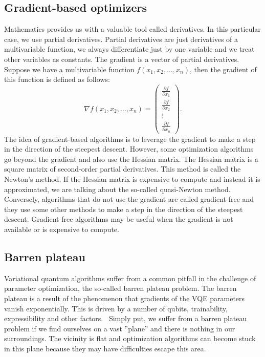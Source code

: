 \subsection{Gradient-based optimizers}
Mathematics provides us with a valuable tool called derivatives. In this particular case, we use partial derivatives. Partial derivatives are just derivatives of a multivariable function, we always differentiate just by one variable and we treat other variables as constants. The gradient is a vector of partial derivatives. Suppose we have a multivariable function $f(x_1, x_2, \ldots, x_n)$, then the gradient of this function is defined as follows:
$$\nabla f(x_1, x_2, \ldots, x_n) =  \begin{pmatrix} \frac{\partial f}{\partial x_1} \\ \frac{\partial f}{\partial x_2} \\ \vdots \\ \frac{\partial f}{\partial x_n}\end{pmatrix} \text{.}$$
The idea of gradient-based algorithms is to leverage the gradient to make a step in the direction of the steepest descent. However, some optimization algorithms go beyond the gradient and also use the Hessian matrix. The Hessian matrix is a square matrix of second-order partial derivatives. This method is called the Newton's method. If the Hessian matrix is expensive to compute and instead it is approximated, we are talking about the so-called quasi-Newton method. Conversely, algorithms that do not use the gradient are called gradient-free and they use some other methods to make a step in the direction of the steepest descent. Gradient-free algorithms may be useful when the gradient is not available or is expensive to compute.


\subsection{Barren plateau}
Variational quantum algorithms suffer from a common pitfall in the challenge of parameter optimization, the so-called barren plateau problem. The barren plateau is a result of the phenomenon that gradients of the VQE parameters vanish exponentially. This is driven by a number of qubits, trainability, expressibility and other factors.~\cite{vqe_method} Simply put, we suffer from a barren plateau problem if we find ourselves on a vast ''plane'' and there is nothing in our surroundings. The vicinity is flat and optimization algorithms can become stuck in this plane because they may have difficulties escape this area.
